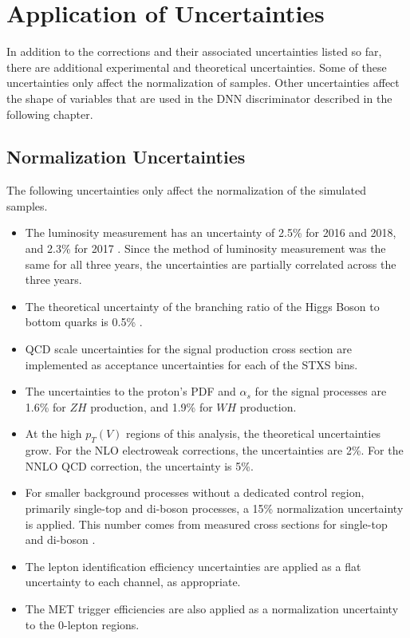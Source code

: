 \section{Application of Uncertainties}

In addition to the corrections and their associated uncertainties listed so far,
there are additional experimental and theoretical uncertainties.
Some of these uncertainties only affect the normalization of samples.
Other uncertainties affect the shape of variables that are used in the DNN
discriminator described in the following chapter.

\subsection{Normalization Uncertainties}

The following uncertainties only affect the normalization of the simulated samples.
\begin{itemize}
\item The luminosity measurement has an uncertainty of
  2.5\% for 2016 and 2018, and 2.3\% for 2017
  \cite{CMS-PAS-LUM-17-001,CMS-PAS-LUM-17-004,CMS-PAS-LUM-18-002}.
  Since the method of luminosity measurement was the same for all three years,
  the uncertainties are partially correlated across the three years.
\item The theoretical uncertainty of the branching ratio of the Higgs Boson
  to bottom quarks is 0.5\% \cite{DeFlorianSabaris:2215893}.
\item QCD scale uncertainties for the signal production cross section
  are implemented as acceptance uncertainties for each of the STXS
  bins. 
\item The uncertainties to the proton's PDF and $\alpha_s$ for the signal processes
  are 1.6\% for $Z\!H$ production, and 1.9\% for $W\!H$ production.
\item At the high $p_T(V)$ regions of this analysis, the theoretical uncertainties grow.
  For the NLO electroweak corrections, the uncertainties are 2\%.
  For the NNLO QCD correction, the uncertainty is 5\%.
\item For smaller background processes without a dedicated control region,
  primarily single-top and di-boson processes, a 15\% normalization uncertainty is applied.
  This number comes from measured cross sections for single-top \cite{2017752}
  and di-boson \cite{2017533}.
\item The lepton identification efficiency uncertainties are applied as a flat uncertainty
  to each channel, as appropriate.
\item The MET trigger efficiencies are also applied as a normalization uncertainty
  to the 0-lepton regions. 
\end{itemize}


